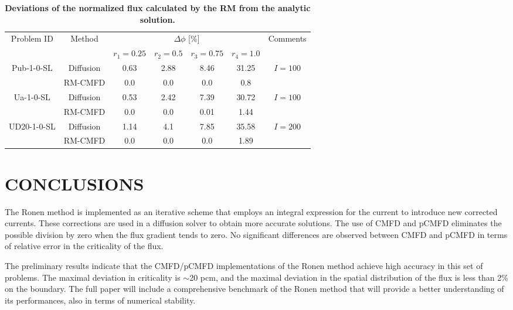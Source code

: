 \documentclass[letterpaper]{mc2021}
\begin{document}
%
\begin{table}[!htb]
	\vspace{-5.5mm}
	\centering
	\small
	\caption{\bf Deviations of the normalized flux calculated by the RM from the analytic solution.}
	\label{table:res2} 
	\begin{tabular}{|c|c|c|c|c|c|c|} \hline 
	\multirow{2}{*}{Problem ID} & \multirow{2}{*}{Method} & \multicolumn{4}{c|}{$\Delta\phi$ [\%]} & \multirow{2}{*}{Comments} \\
	\cline{3-6}
	& & $r_1 = 0.25$ & $r_2 = 0.5$ & $r_3 = 0.75$ & $r_4 = 1.0$ & \\
	\hline
	\multirow{2}{*}{Pub-1-0-SL} & Diffusion  & 0.63 & 2.88 & 8.46 & 31.25 & \multirow{2}{*}{$I=100$} \\
	\cline{2-6}
	& RM-CMFD 	     & 0.0 & 0.0 & 0.0 & 0.8 & \\ \hline
	\multirow{2}{*}{Ua-1-0-SL}  & Diffusion  & 0.53 & 2.42 & 7.39 & 30.72 & \multirow{2}{*}{$I=100$}\\
	\cline{2-6} 
	& RM-CMFD       & 0.0 & 0.0 & 0.01 & 1.44 & \\ \hline 
	\multirow{2}{*}{UD20-1-0-SL} & Diffusion & 1.14 & 4.1 & 7.85 & 35.58 & \multirow{2}{*}{$I=200$} \\ 
	\cline{2-6} 		
	& RM-CMFD      & 0.0 & 0.0 & 0.0 & 1.89 & \\ \hline 		
\end{tabular}
\vspace{-5.0mm}
\end{table}

\section{CONCLUSIONS}

The Ronen method is implemented as an iterative scheme that employs an integral expression for the current to introduce new corrected currents. These corrections are used in a diffusion solver to obtain more accurate solutions. The use of CMFD and pCMFD eliminates the possible division by zero when the flux gradient tends to zero. No significant differences are observed between CMFD and pCMFD in terms of relative error in the criticality of the flux. 

The preliminary results indicate that the CMFD/pCMFD implementations of the Ronen method achieve high accuracy in this set of problems. The maximal deviation in criticality is $\sim$20 pcm, and the maximal deviation in the spatial distribution of the flux is less than 2\% on the boundary.  
%
The full paper will include a comprehensive benchmark of the Ronen method that will provide a better understanding of its performances, also in terms of numerical stability.
\end{document}
